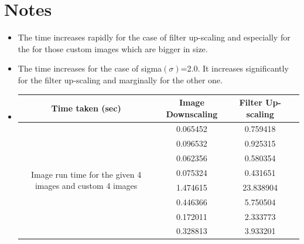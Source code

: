 \documentclass[a4paper,11pt]{article}
\begin{document}
\section*{Notes}
\begin{itemize}
	\item The time increases rapidly for the case of filter up-scaling and especially for the for those custom images which are bigger in size.
	\item The time increases for the case of sigma$(\sigma)$=2.0. It increases significantly for the filter up-scaling and marginally for the other one.
	\item 	\begin{tabular}{ |c|c|c|c| } 
		\hline
		Time taken (sec) & Image Downscaling & Filter Up-scaling \\
		\hline
		\multirow{8}{7em}{Image run time for the given 4 images and custom 4 images} & 0.065452 & 0.759418 \\ 
		& 0.096532 & 0.925315  \\ 
		& 0.062356 & 0.580354 \\ 
		& 0.075324 & 0.431651 \\ 
		& 1.474615 & 23.838904 \\ 
		& 0.446366 & 5.750504 \\ 
		& 0.172011 & 2.333773 \\
		& 0.328813 & 3.933201 \\
		\hline
	\end{tabular}
	\vfill
	

\end{itemize}
\end{document}
